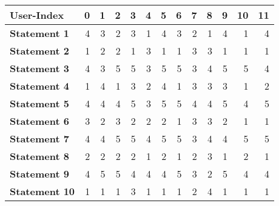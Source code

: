 \begin{tabular}{l||rrrrrrrrrrrr}
\toprule
\textbf{User-Index} &  0  &  1  &  2  &  3  &  4  &  5  &  6  &  7  &  8  &  9  &  10 &  11 \\
\midrule
\textbf{Statement 1} &   4 &   3 &   2 &   3 &   1 &   4 &   3 &   2 &   1 &   4 &   1 &   4 \\
\textbf{Statement 2}         &   1 &   2 &   2 &   1 &   3 &   1 &   1 &   3 &   3 &   1 &   1 &   1 \\
\textbf{Statement 3}       &   4 &   3 &   5 &   5 &   3 &   5 &   5 &   3 &   4 &   5 &   5 &   4 \\
\textbf{Statement 4} &   1 &   4 &   1 &   3 &   2 &   4 &   1 &   3 &   3 &   3 &   1 &   2 \\
\textbf{Statement 5} &   4 &   4 &   4 &   5 &   3 &   5 &   5 &   4 &   4 &   5 &   4 &   5 \\
\textbf{Statement 6} &   3 &   2 &   3 &   2 &   2 &   2 &   1 &   3 &   3 &   2 &   1 &   1 \\
\textbf{Statement 7} &   4 &   4 &   5 &   5 &   4 &   5 &   5 &   3 &   4 &   4 &   5 &   5 \\
\textbf{Statement 8}  &   2 &   2 &   2 &   2 &   1 &   2 &   1 &   2 &   3 &   1 &   2 &   1 \\
\textbf{Statement 9} &   4 &   5 &   5 &   4 &   4 &   4 &   5 &   3 &   2 &   5 &   4 &   4 \\
\textbf{Statement 10} &   1 &   1 &   1 &   3 &   1 &   1 &   1 &   2 &   4 &   1 &   1 &   1 \\
\bottomrule
\end{tabular}
